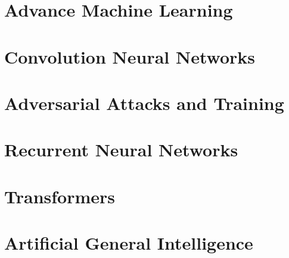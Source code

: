 \documentclass[10pt]{book}
\begin{document}
\part{Advance Machine Learning}
\part{Convolution Neural Networks}
\part{Adversarial Attacks and Training}

\part{Recurrent Neural Networks}
\part{Transformers}
\part{Artificial General Intelligence}


\backmatter


\end{document}
